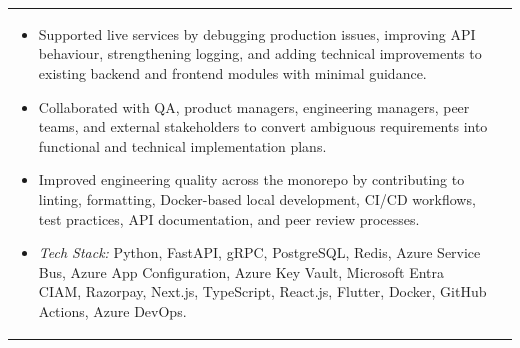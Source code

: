 \documentclass[a4paper,8pt]{article}
\begin{document}
\begin{tabularx}{\linewidth}{ @{}l r@{} }
\begin{minipage}[t]{\linewidth}
\begin{itemize}[nosep,after=\strut, leftmargin=2em, itemsep=2pt]
        \item Supported live services by debugging production issues, improving API behaviour, strengthening logging, and adding technical improvements to existing backend and frontend modules with minimal guidance.
        \item Collaborated with QA, product managers, engineering managers, peer teams, and external stakeholders to convert ambiguous requirements into functional and technical implementation plans.
        \item Improved engineering quality across the monorepo by contributing to linting, formatting, Docker-based local development, CI/CD workflows, test practices, API documentation, and peer review processes.
        \item \textit{Tech Stack:} Python, FastAPI, gRPC, PostgreSQL, Redis, Azure Service Bus, Azure App Configuration, Azure Key Vault, Microsoft Entra CIAM, Razorpay, Next.js, TypeScript, React.js, Flutter, Docker, GitHub Actions, Azure DevOps.
    \end{itemize}
\end{minipage}
\end{tabularx}
\end{document}
